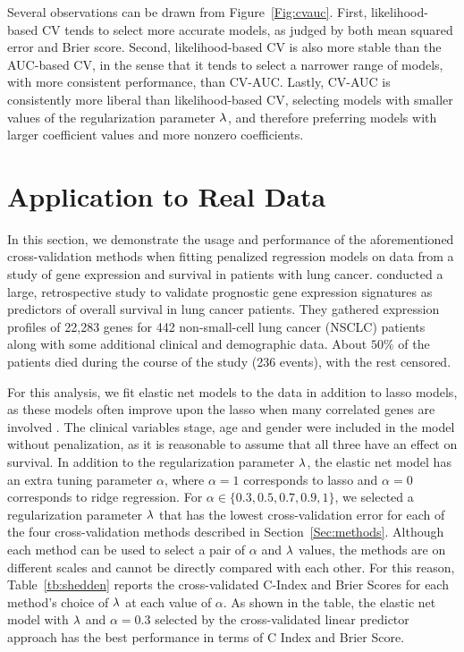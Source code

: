 \afterpage{\clearpage}

Several observations can be drawn from Figure~\ref{Fig:cvauc}. First, likelihood-based CV tends to select more accurate models, as judged by both mean squared error and Brier score.  Second, likelihood-based CV is also more stable than the AUC-based CV, in the sense that it tends to select a narrower range of models, with more consistent performance, than CV-AUC.  Lastly, CV-AUC is consistently more liberal than likelihood-based CV, selecting models with smaller values of the regularization parameter $\lambda$, and therefore preferring models with larger coefficient values and more nonzero coefficients.

\section{Application to Real Data}

In this section, we demonstrate the usage and performance of the aforementioned cross-validation methods when fitting penalized regression models on data from a study of gene expression and survival in patients with lung cancer. \citet{shedden2008gene} conducted a large, retrospective study to validate prognostic gene expression signatures as predictors of overall survival in lung cancer patients. They gathered expression profiles of 22,283 genes for 442 non-small-cell lung cancer (NSCLC) patients along with some additional clinical and demographic data. About $50\%$ of the patients died during the course of the study (236 events), with the rest censored. 

For this analysis, we fit elastic net models to the data in addition to lasso models, as these models often improve upon the lasso when many correlated genes are involved \citep{Zou2005}. The clinical variables stage, age and gender were included in the model without penalization, as it is reasonable to assume that all three have an effect on survival. In addition to the regularization parameter $\lambda$, the elastic net model has an extra tuning parameter $\alpha$, where $\alpha=1$ corresponds to lasso and $\alpha=0$ corresponds to ridge regression. For $\alpha \in \{0.3, 0.5, 0.7, 0.9, 1\}$, we selected a regularization parameter $\lambda$ that has the lowest cross-validation error for each of the four cross-validation methods described in Section~\ref{Sec:methods}.  Although each method can be used to select a pair of $\alpha$ and $\lambda$ values, the methods are on different scales and cannot be directly compared with each other.  For this reason, Table~\ref{tb:shedden} reports the cross-validated C-Index and Brier Scores for each method's choice of $\lambda$ at each value of $\alpha$.  As shown in the table, the elastic net model with $\lambda$ and $\alpha=0.3$ selected by the cross-validated linear predictor approach has the best performance in terms of C Index and Brier Score.

